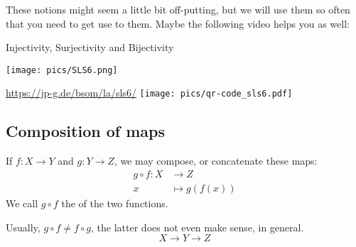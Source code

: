 These notions might seem a little bit off-putting, but we will use them so often that you need to get use to them. Maybe the following video
helps you as well:

\begin{Video}{Injectivity{,} Surjectivity and Bijectivity}
	\begin{minipage}{0.5\linewidth}
		\begin{center}
			\texttt{[image: pics/SLS6.png]}
		\end{center}
	\end{minipage}
	\begin{minipage}{0.5\linewidth}
		\begin{center}
			\url{https://jp-g.de/bsom/la/sls6/}
			\texttt{[image: pics/qr-code\_sls6.pdf]}
		\end{center}
	\end{minipage}
\end{Video}



\subsection*{Composition of maps}

\begin{Definition}{}
If $f:X \to Y$ and $g : Y\to Z$, we may compose, or concatenate these maps:
\begin{align*}
 g \circ f : X &\to  Z\\
            x &\mapsto g(f(x))
\end{align*}
We call $g \circ f$ the  of the two functions.
\end{Definition}

Usually, $g\circ f \neq f\circ g$, the latter does not even make sense, in general. 
\[
 X \to Y \to Z
\]

